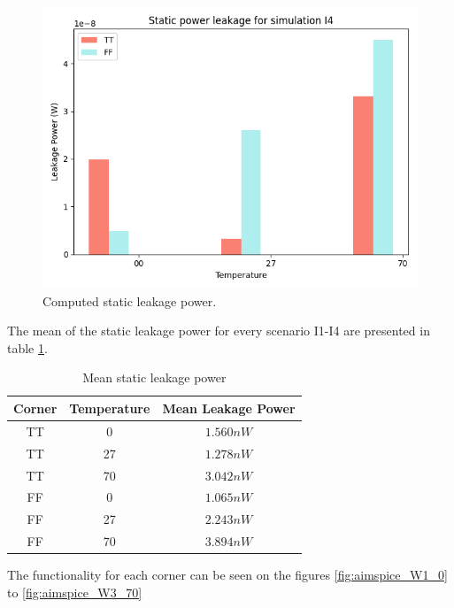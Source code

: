 \begin{figure}[H]
    \vspace{5pt}
    \includegraphics[height= 0.21\textheight]{figures/aimspice/0.600_0.1u_0.1u_0.300u_0.1u/leakage_data/leakage_power_I11.png}
    \vspace{5pt}
    \caption{Computed static leakage power.}
    \label{fig:static_leakage_power_bar}
\end{figure}

The mean of the static leakage power for every scenario I1-I4 are presented in table \ref{tab:leakage_power}.

\begin{table}[H]
    \centering
    \caption{Mean static leakage power}
    \label{tab:leakage_power}
    \begin{tabular}{ccc}
    \hline
    \textbf{Corner} & \textbf{Temperature} & \textbf{Mean Leakage Power} \\
    \hline
    TT & 0  & $1.560 nW$\\
    TT & 27 & $1.278 nW$\\
    TT & 70 & $3.042 nW$\\
    FF & 0  & $1.065 nW$\\
    FF & 27 & $2.243 nW$\\
    FF & 70 & $3.894 nW$\\
    \end{tabular}
\end{table}

The functionality for each corner can be seen on the figures \ref{fig:aimspice_W1_0} to \ref{fig:aimspice_W3_70}

